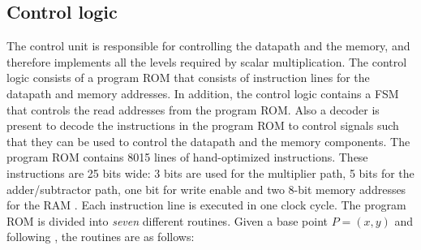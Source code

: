 \subsection{Control logic} \label{subsec: Control Logic}
The control unit is responsible for controlling the datapath and the memory, and therefore implements all the levels required by {\fourqs} scalar multiplication.
The control logic consists of a program ROM that consists of instruction lines for the datapath and memory addresses.
In addition, the control logic contains a FSM that controls the read addresses from the program ROM.
Also a decoder is present to decode the instructions in the program ROM to control signals such that they can be used to control the datapath and the memory components.
The program ROM contains 8015 lines of hand-optimized instructions.
These instructions are 25 bits wide:
3 bits are used for the multiplier path, 5 bits for the adder/subtractor path, one bit for write enable and two 8-bit memory addresses for the RAM \cite{jarvinen2016four}.
Each instruction line is executed in one clock cycle.
The program ROM is divided into \emph{seven} different routines.
Given a base point $P = (x, y)$ and following \cite[Algorithm 1]{jarvinen2016four}, the routines are as follows:
%
